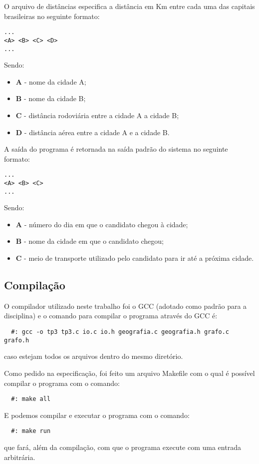 \documentclass[12pt]{article}
\begin{document}
O arquivo de distâncias especifica a distância em Km entre cada uma das capitais brasileiras
no seguinte formato:
\begin{verbatim}
...
<A> <B> <C> <D>
...
\end{verbatim}
Sendo:
\begin{itemize}
  \item \textbf{A} - nome da cidade A;
  \item \textbf{B} - nome da cidade B; 
  \item \textbf{C} - distância rodoviária entre a cidade A a cidade B;
  \item \textbf{D} - distância aérea entre a cidade A e a cidade B. 
\end{itemize}

A saída do programa é retornada na saída padrão do sistema no seguinte formato:
\begin{verbatim}
...
<A> <B> <C>
...
\end{verbatim}
Sendo:
\begin{itemize}
  \item \textbf{A} - número do dia em que o candidato chegou à cidade;
  \item \textbf{B} - nome da cidade em que o candidato chegou; 
  \item \textbf{C} - meio de transporte utilizado pelo candidato para ir até a próxima cidade.
\end{itemize}

\subsection{Compilação}
O compilador utilizado neste trabalho foi o GCC (adotado como padrão para a disciplina) e 
o comando para compilar o programa através do GCC é:
\begin{verbatim}
  #: gcc -o tp3 tp3.c io.c io.h geografia.c geografia.h grafo.c grafo.h
\end{verbatim}
caso estejam todos os arquivos dentro do mesmo diretório.

Como pedido na especificação, foi feito um arquivo Makefile com o qual é possível compilar
o programa com o comando: 
\begin{verbatim}
  #: make all
\end{verbatim}

E podemos compilar e executar o programa com o comando:
\begin{verbatim}
  #: make run
\end{verbatim}
que fará, além da compilação, com que o programa execute com uma entrada arbitrária.
\end{document}
